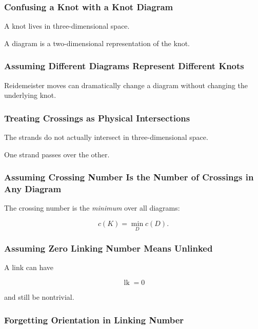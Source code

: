 \subsubsection{Confusing a Knot with a Knot Diagram}

A knot lives in three-dimensional space.

A diagram is a two-dimensional representation of the knot.

\subsubsection{Assuming Different Diagrams Represent Different Knots}

Reidemeister moves can dramatically change a diagram without changing the
underlying knot.

\subsubsection{Treating Crossings as Physical Intersections}

The strands do not actually intersect in three-dimensional space.

One strand passes over the other.

\subsubsection{Assuming Crossing Number Is the Number of Crossings in Any Diagram}

The crossing number is the \emph{minimum} over all diagrams:

\[
\boxed{
c(K)
=
\min_D c(D).
}
\]

\subsubsection{Assuming Zero Linking Number Means Unlinked}

A link can have

\[
\operatorname{lk}=0
\]

and still be nontrivial.

\subsubsection{Forgetting Orientation in Linking Number}

